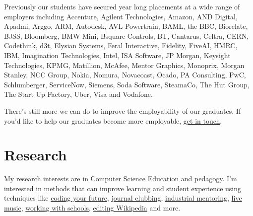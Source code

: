 \documentclass[
  12pt,
]{book}
\begin{document}
Previously our students have secured year long placements at a wide range of employers including Accenture, Agilent Technologies, Amazon, AND Digital, Apadmi, Arggo, ARM, Autodesk, AVL Powertrain, BAML, the BBC, Biorelate, BJSS, Bloomberg, BMW Mini, Bsquare Controls, BT, Cantarus, Celtra, CERN, Codethink, d3t, Elysian Systems, Feral Interactive, Fidelity, FiveAI, HMRC, IBM, Imagination Technologies, Intel, ISA Software, JP Morgan, Keysight Technologies, KPMG, Matillion, McAfee, Mentor Graphics, Monoprix, Morgan Stanley, NCC Group, Nokia, Nomura, Novacoast, Ocado, PA Consulting, PwC, Schlumberger, ServiceNow, Siemens, Soda Software, SteamaCo, The Hut Group, The Start Up Factory, Uber, Visa and Vodafone.

There's still more we can do to improve the employability of our graduates. If you'd like to help our graduates become more employable, \href{Contact}{get in touch}.

\hypertarget{research}{%
\chapter{Research}\label{research}}

My research interests are in \href{https://en.wikipedia.org/wiki/Computer_science_education}{Computer Science Education} and \href{https://en.wikipedia.org/wiki/Pedagogy}{pedagogy}. \citep{CERhandbook, JohnBiggs2011, Fry2014} I'm interested in methods that can improve learning and student experience using techniques like \href{https://www.cdyf.me}{coding your future}, \href{https://sigcse.cs.manchester.ac.uk/}{journal clubbing}, \href{https://www.cs.manchester.ac.uk/connect/business-engagement/industrial-mentoring/}{industrial mentoring}, \protect\hyperlink{tuningcomplete}{live music}, \href{http://www.cs.man.ac.uk/~hulld/coding-their-future.html}{working with schools}, \protect\hyperlink{wikipedia}{editing Wikipedia} and more.
\end{document}
